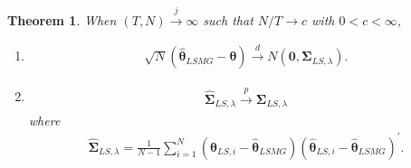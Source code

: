 \documentclass[12pt,a4paper,hyperref]{article}
\newtheorem{myTheo}{Theorem}
\begin{document}
\begin{myTheo}
When $(T,N) \overset{j}{\to} \infty$ such that $N/T \to c$ with $0<c< \infty$,
\begin{enumerate}
\item \begin{align}
\sqrt{N}\left(\hat{\boldsymbol{\theta}}_{LSMG}-\boldsymbol{\theta}  \right)\overset{d}{\to} N\left(\boldsymbol{0},\boldsymbol{\Sigma}_{LS,\lambda} \right).
\end{align}
\item \begin{align}
\hat{\boldsymbol{\Sigma}}_{LS,\lambda} \overset{p}{\to}  \boldsymbol{\Sigma}_{LS,\lambda}
\end{align}
where
\begin{align}
 \hat{\boldsymbol{\Sigma}}_{LS,\lambda}=\frac{1}{N-1}\sum^{N}_{i=1}\left( \hat{\boldsymbol{\theta}}_{LS,i}- \hat{\boldsymbol{\theta}}_{LSMG}\right)\left( \hat{\boldsymbol{\theta}}_{LS,i}- \hat{\boldsymbol{\theta}}_{LSMG}\right)^{'}.
\end{align}
\end{enumerate}
\end{myTheo}



\renewcommand\refname{References}


\end{document}
